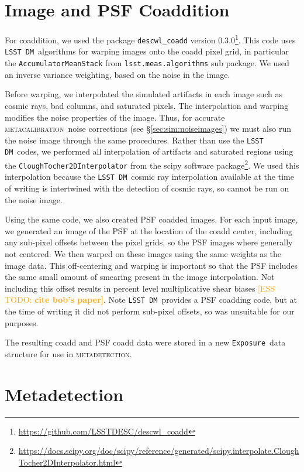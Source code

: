 \documentclass[twocolumn,twocolappendix,astrosym]{openjournal}
\newcommand{\esstodo}[1]{\textcolor{orange}{[ESS TODO: \bf #1]}}
\newcommand{\calexp}{\texttt{Exposure}}
\newcommand{\dm}{\texttt{LSST DM}}
\newcommand{\mcal}{\textsc{metacalibration}}
\newcommand{\mdet}{\textsc{metadetection}}
\begin{document}
\section{Image and PSF Coaddition} \label{sec:coadding}

For coaddition, we used the package \texttt{descwl\_coadd} version
0.3.0\footnote{\url{https://github.com/LSSTDESC/descwl_coadd}}.  This code uses
\dm\ algorithms for warping images onto the coadd pixel grid, in particular the
\texttt{AccumulatorMeanStack} from \texttt{lsst.meas.algorithms} sub package.
We used an inverse variance weighting, based on the noise in the image.

Before warping, we interpolated the simulated artifacts in each image such as
cosmic rays, bad columns, and saturated pixels.  The interpolation and warping
modifies the noise properties of the image.  Thus, for accurate \mcal\ noise
corrections (see \S \ref{sec:sim:noiseimages}) we must also run the noise image
through the same procedures.  Rather than use the \dm\ codes, we performed all
interpolation of artifacts and saturated regions using the
\texttt{CloughTocher2DInterpolator} from the scipy software
package\footnote{\url{https://docs.scipy.org/doc/scipy/reference/generated/scipy.interpolate.CloughTocher2DInterpolator.html}}.
We used this interpolation because the \dm\ cosmic ray interpolation available
at the time of writing is intertwined with the detection of cosmic rays, so
cannot be run on the noise image.

Using the same code, we also created PSF coadded images.  For each input image,
we generated an image of the PSF at the location of the coadd center, including
any sub-pixel offsets between the pixel grids, so the PSF images where
generally not centered.  We then warped on these images using the same weights
as the image data.  This off-centering and warping is important so that the PSF
includes the same small amount of smearing present in the image interpolation.
Not including this offset results in percent level multiplicative shear biases
\esstodo{cite bob's paper}.  Note \dm\ provides a PSF coadding code, but at the
time of writing it did not perform sub-pixel offsets, so was unsuitable for
our purposes.

The resulting coadd and PSF coadd data were stored in a new \calexp\ data
structure for use in \mdet.

\section{Metadetection} \label{sec:mdet}
\end{document}
